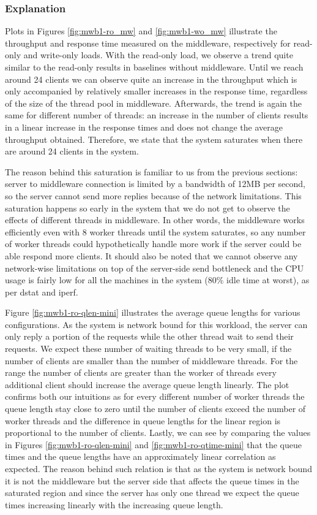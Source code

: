 \documentclass[11pt,a4paper]{article}
\begin{document}
\subsubsection{Explanation} \label{sec:mwb1-exp}
Plots in Figures \ref{fig:mwb1-ro_mw} and \ref{fig:mwb1-wo_mw} illustrate the throughput and response time measured on the middleware, respectively for read-only and write-only loads. With the read-only load, we observe a trend quite similar to the read-only results in baselines without middleware. Until we reach around 24 clients we can observe quite an increase in the throughput which is only accompanied by relatively smaller increases in the response time, regardless of the size of the thread pool in middleware. Afterwards, the trend is again the same for different number of threads: an increase in the number of clients results in a linear increase in the response times and does not change the average throughput obtained. Therefore, we state that the system saturates when there are around 24 clients in the system.
\par The reason behind this saturation is familiar to us from the previous sections: server to middleware connection is limited by a bandwidth of 12MB per second, so the server cannot send more replies because of the network limitations. This saturation happens so early in the system that we do not get to observe the effects of different threads in middleware. In other words, the middleware works efficiently even with 8 worker threads until the system saturates, so any number of worker threads could hypothetically handle more work if the server could be able respond more clients. It should also be noted that we cannot observe any network-wise limitations on top of the server-side send bottleneck and the CPU usage is fairly low for all the machines in the system ($80\%$ idle time at worst), as per dstat and iperf. 
\par Figure \ref{fig:mwb1-ro-qlen-mini} illustrates the average queue lengths for various configurations. As the system is network bound for this workload, the server can only reply a portion of the requests while the other thread wait to send their requests. We expect these number of waiting threads to be very small, if the number of clients are smaller than the number of middleware threads. For the range the number of clients are greater than the worker of threads every additional client should increase the average queue length linearly. The plot confirms both our intuitions as for every different number of worker threads the queue length stay close to zero until the number of clients exceed the number of worker threads and the difference in queue lengths for the linear region is proportional to the number of clients. Lastly, we can see by comparing the values in Figures \ref{fig:mwb1-ro-qlen-mini} and \ref{fig:mwb1-ro-qtime-mini} that the queue times and the queue lengths have an approximately linear correlation as expected. The reason behind such relation is that as the system is network bound it is not the middleware but the server side that affects the queue times in the saturated region and since the server has only one thread we expect the queue times increasing linearly with the increasing queue length.
\end{document}
